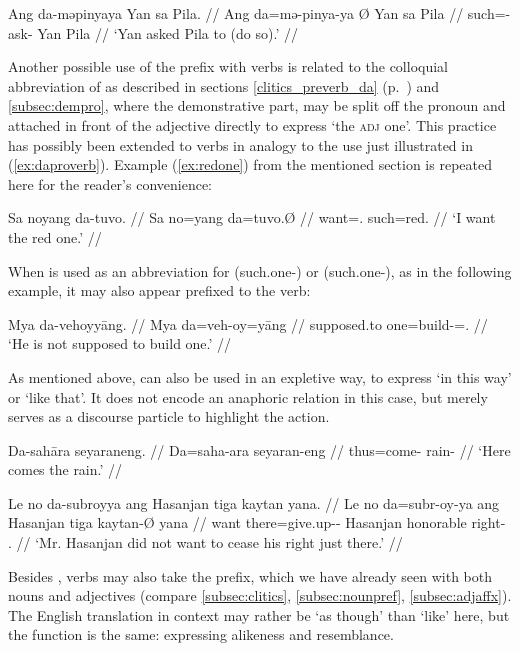 \a\begingl
	\gla Ang da-məpinyaya {} Yan sa Pila. //
	\glb Ang da=mə-pinya-ya Ø Yan sa Pila //
	\glc \AgtT{} such=\Pst{}-ask-\TsgM{} \Top{} Yan \Parg{} Pila //
	\glft `Yan asked Pila to (do so).' //
\endgl

\xe

Another possible use of the prefix  with verbs is related to the
colloquial abbreviation of  as described in
sections \autoref{clitics_preverb_da} (p.~\pageref{clitics_preverb_da}) and
\autoref{subsec:dempro}, where the demonstrative part,  may be
split off the pronoun and attached in front of the adjective directly to
express `the \textsc{adj} one'. This practice has possibly been extended to
verbs in analogy to the use just illustrated in (\ref{ex:daproverb}). Example
(\ref{ex:redone}) from the mentioned section is repeated here for the reader's
convenience:

\ex\begingl
	\gla Sa noyang da-tuvo. //
	\glb Sa no=yang da=tuvo.Ø //
	\glc \PatT{} want=\Fsg{}.\Aarg{} such=red.\Top{} //
	\glft `I want the red one.' //
\endgl\xe

When  is used as an abbreviation for  
(such.one-\Parg{}) or  (such.one-\PargI{}), as in the 
following example, it may also appear prefixed to the verb:

\ex\begingl
	\gla Mya da-vehoyyāng. //
	\glb Mya da=veh-oy=yāng //
	\glc supposed.to one=build-\Neg{}=\Tsg.\M{} //
	\glft `He is not supposed to build one.' //
\endgl\xe

As mentioned above,  can also be used in an expletive way, to 
express `in this way' or `like that'. It does not encode an anaphoric relation 
in this case, but merely serves as a discourse particle to highlight the action.

\pex
\a\begingl
	\gla Da-sahāra seyaraneng. //
	\glb Da=saha-ara seyaran-eng //
	\glc thus=come-\TsgI{} rain-\AargI{} //
	\glft `Here comes the rain.' //
\endgl

\a\begingl
	\gla Le no da-subroyya ang Hasanjan tiga kaytan yana. //
	\glb Le no da=subr-oy-ya ang Hasanjan tiga kaytan-Ø yana //
	\glc \PatT{} want there=give.up-\Neg{}-\TsgM{} \Aarg{} Hasanjan 
		honorable right-\Top{} \TsgM{}.\Gen{} //
	\glft `Mr. Hasanjan did not want to cease his right just there.' //
\endgl

\xe

Besides , verbs may also take the  prefix,
which we have already seen with both nouns and adjectives (compare
\autoref{subsec:clitics}, \ref{subsec:nounpref}, \ref{subsec:adjaffx}). The
English translation in  context may rather be `as though' than `like' here,
but the function is the  same: expressing alikeness and resemblance.

